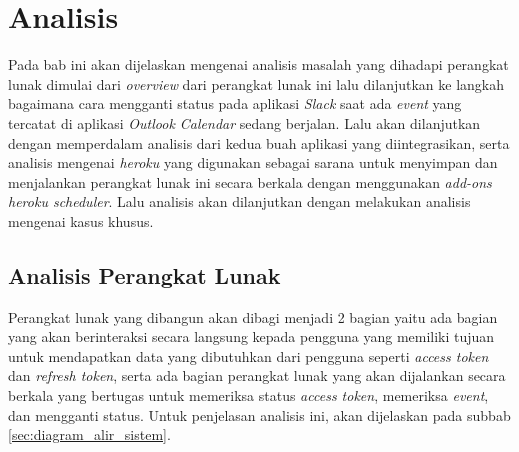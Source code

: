 \chapter{Analisis}
\label{chap:analisis}

Pada bab ini akan dijelaskan mengenai analisis masalah yang dihadapi perangkat lunak dimulai dari \textit{overview} dari perangkat lunak ini lalu dilanjutkan ke langkah bagaimana cara mengganti status pada aplikasi \textit{Slack} saat ada \textit{event} yang tercatat di aplikasi \textit{Outlook Calendar} sedang berjalan. Lalu akan dilanjutkan dengan memperdalam analisis dari kedua buah aplikasi yang diintegrasikan, serta analisis mengenai \textit{heroku} yang digunakan sebagai sarana untuk menyimpan dan menjalankan perangkat lunak ini secara berkala dengan menggunakan \textit{add-ons heroku scheduler}. Lalu analisis akan dilanjutkan dengan melakukan analisis mengenai kasus khusus. 

\section{Analisis Perangkat Lunak}
Perangkat lunak yang dibangun akan dibagi menjadi 2 bagian yaitu ada bagian yang akan berinteraksi secara langsung kepada pengguna yang memiliki tujuan untuk mendapatkan data yang dibutuhkan dari pengguna seperti \textit{access token} dan \textit{refresh token}, serta ada bagian perangkat lunak yang akan dijalankan secara berkala yang bertugas untuk memeriksa status \textit{access token}, memeriksa \textit{event}, dan mengganti status. Untuk penjelasan analisis ini, akan dijelaskan pada subbab \ref{sec:diagram_alir_sistem}. 
